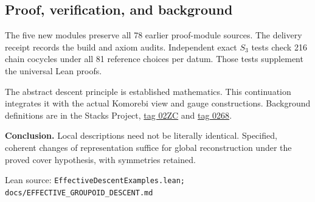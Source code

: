 \documentclass[11pt]{article}
\newcommand{\source}[1]{\par{\footnotesize\textsf{Lean source:} \texttt{#1}}\par}
\begin{document}
\subsection*{Proof, verification, and background}
The five new modules preserve all 78 earlier proof-module sources. The delivery receipt records the build and axiom audits. Independent exact $S_3$ tests check 216 chain cocycles under all 81 reference choices per datum. Those tests supplement the universal Lean proofs.

The abstract descent principle is established mathematics. This continuation integrates it with the actual Komorebi view and gauge constructions. Background definitions are in the Stacks Project, \href{https://stacks.math.columbia.edu/tag/02ZC}{tag 02ZC} and \href{https://stacks.math.columbia.edu/tag/0268}{tag 0268}.

\textbf{Conclusion.} Local descriptions need not be literally identical. Specified, coherent changes of representation suffice for global reconstruction under the proved cover hypothesis, with symmetries retained.
\source{EffectiveDescentExamples.lean; docs/EFFECTIVE\_GROUPOID\_DESCENT.md}
\end{document}
